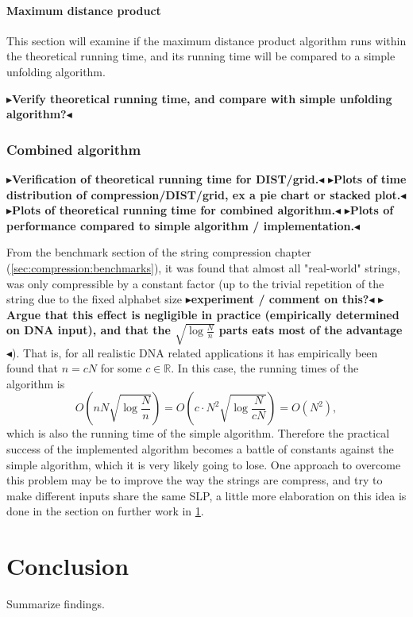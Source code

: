 \documentclass[twoside,11pt,openright]{report}
\newcommand{\todo}[1]{{\color[rgb]{.5,0,0}\textbf{$\blacktriangleright$#1$\blacktriangleleft$}}}
\begin{document}
\subsubsection{Maximum distance product}
This section will examine if the maximum distance product algorithm runs within the theoretical running time, and its running time will be compared to a simple unfolding algorithm.

\todo{Verify theoretical running time, and compare with simple unfolding algorithm?}

\subsection{Combined algorithm}
\todo{Verification of theoretical running time for DIST/grid.}
\todo{Plots of time distribution of compression/DIST/grid, ex a pie chart or stacked plot.}
\todo{Plots of theoretical running time for combined algorithm.}
\todo{Plots of performance compared to simple algorithm / implementation.}

From the benchmark section of the string compression chapter (\cref{sec:compression:benchmarks}), it was found that almost all "real-world" strings, was only compressible by a constant factor (up to the trivial repetition of the string due to the fixed alphabet size \todo{experiment / comment on this?} \todo{Argue that this effect is negligible in practice (empirically determined on DNA input), and that the $\sqrt{\log{\frac{N}{n}}}$ parts eats most of the advantage}). That is, for all realistic DNA related applications it has empirically been found that $n = cN$ for some $c \in \mathbb{R}$. In this case, the running times of the algorithm is
\[
  O\left( nN\sqrt{\log{\frac{N}{n}}} \right) = O\left( c \cdot N^2 \sqrt{\log{\frac{N}{cN}}} \right) = O(N^2),
\]
which is also the running time of the simple algorithm. Therefore the practical success of the implemented algorithm becomes a battle of constants against the simple algorithm, which it is very likely going to lose. One approach to overcome this problem may be to improve the way the strings are compress, and try to make different inputs share the same SLP, a little more elaboration on this idea is done in the section on further work in \cref{chapter:conclusion}.


\chapter{Conclusion}
\label{chapter:conclusion}
Summarize findings.
\end{document}
